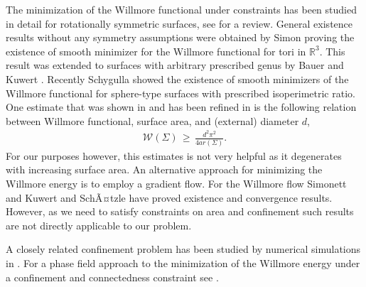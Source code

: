 \documentclass[reqno,makeidx,12pt]{amsart}
\theoremstyle{note}
\theoremstyle{definition}
\begin{document}
The minimization of the Willmore functional under constraints has been studied in detail for rotationally symmetric surfaces, see \cite{Seif97} for a review. General existence results without any symmetry assumptions were obtained by Simon \cite{Simo93} proving the existence of smooth minimizer for the Willmore functional for tori in ${\mathbb R}^3$. This result was extended  to surfaces with arbitrary prescribed genus by Bauer and Kuwert \cite{BaKu03}. Recently Schygulla \cite{Schy12} showed the existence of smooth minimizers of the Willmore functional for sphere-type surfaces with prescribed isoperimetric ratio. One estimate that was shown in \cite{Simo93} and has been refined in \cite{Topp98} is the following relation between Willmore functional, surface area, and (external) diameter $d$,
\begin{gather*}
	{\mathcal{W}}(\Sigma) \,\geq\, \frac{d^2\pi^2}{4{ar}(\Sigma)}.
\end{gather*}
For our purposes however, this estimates is not very helpful as it degenerates with increasing surface area. An alternative approach for minimizing the Willmore energy is to employ a gradient flow. For the Willmore flow Simonett \cite{Simo01} and Kuwert and SchÃ¤tzle \cite{KuSc01,KuSc02,KuSc04} have proved existence and convergence results. However, as we need to satisfy constraints on area and confinement such results are not directly applicable to our problem. 

A closely related confinement problem has been studied by numerical simulations in \cite{KaSM12}. For a phase field approach to the minimization of the Willmore energy under a confinement and connectedness constraint see \cite{DoMR13}.
\end{document}
